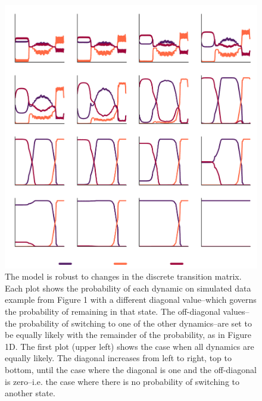 \documentclass[times, twoside]{zHenriquesLab-StyleBioRxiv}
\begin{document}
\newpage

\beginsupplement
\captionsetup*{format=largeformat}

\begin{figure}%
\centering
\includegraphics[width=0.80\linewidth]{figures/Figure1-supplemental1/Figure1_v1_supplemental1}
\caption{The model is robust to changes in the discrete transition matrix. Each plot shows the probability of each dynamic on simulated data example from Figure 1 with a different diagonal value--which governs the probability of remaining in that state. The off-diagonal values--the probability of switching to one of the other dynamics--are set to be equally likely with the remainder of the probability, as in Figure 1D. The first plot (upper left) shows the case when all dynamics are equally likely. The diagonal increases from left to right, top to bottom, until the case where the diagonal is one and the off-diagonal is zero--i.e. the case where there is no probability of switching to another state.}
\label{fig:Figure1-Figure supplement 1}
\end{figure}
\end{document}
